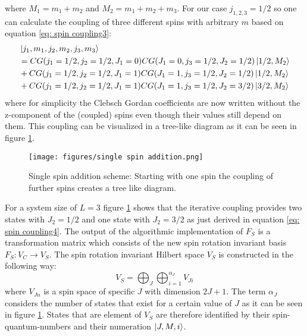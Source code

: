 \documentclass{scrartcl}
\begin{document}
where $M_1=m_1+m_2$ and $M_2=m_1+m_2+m_3$. For our case $j_{1,2,3}=1/2$ so one can calculate the coupling of three different spins with arbitrary $m$ based on equation \ref{eq: spin coupling3}:
\begin{equation}
\begin{aligned}
&\ket{j_1,m_1,j_2,m_2,j_3,m_3}
\\&=CG(j_1=1/2,j_2=1/2,J_1=0)CG(J_1=0,j_3=1/2,J_2=1/2)\ket{1/2, M_2} \\ &+ CG(j_1=1/2,j_2=1/2,J_1=1)CG(J_1=1,j_3=1/2,J_2=1/2) \ket{1/2, M_2} 
    \\ &+ CG(j_1=1/2,j_2=1/2,J_1=1)CG(J_1=1,j_3=1/2,J_2=3/2) \ket{3/2, M_2}
    \label{eq: spin coupling4}
\end{aligned}
\end{equation}
where for simplicity the Clebsch Gordan coefficients are now written without the z-component of the (coupled) spins even though their values still depend on them. This coupling can be visualized in a tree-like diagram as it can be seen in figure \ref{fig:single spin addition}.

\begin{figure}[htbp]
    \centering
    \texttt{[image: figures/single spin addition.png]}
    \caption{Single spin addition scheme: Starting with one spin the coupling of further spins creates a tree like diagram.}
    \label{fig:single spin addition}
\end{figure}
\FloatBarrier

\noindent For a system size of $L=3$ figure \ref{fig:single spin addition} shows that the iterative coupling provides two states with $J_2=1/2$ and one state with $J_2=3/2$ as just derived in equation \ref{eq: spin coupling4}. \newpage \noindent The output of the algorithmic implementation of $F_S$ is a transformation matrix which consists of the new spin rotation invariant basis $F_S:V_C \rightarrow V_S$. The spin rotation invariant Hilbert space $V_S$ is constructed in the following way:
\begin{equation}
    V_S= \bigoplus_J \bigoplus_{i=1}^{\alpha_J} V_{J i}
\end{equation}
where $V_{J n}$ is a spin space of specific $J$ with dimension $2 J+1$. The term $\alpha_J$ considers the number of states that exist for a certain value of $J$ as it can be seen in figure \ref{fig:single spin addition}. States that are element of $V_S$ are therefore identified by their spin-quantum-numbers and their numeration $\ket{J,M,i}$.\
\end{document}
